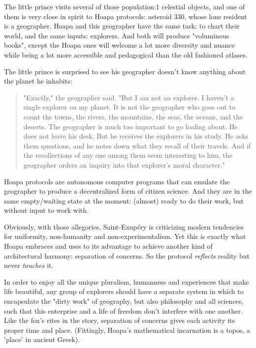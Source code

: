 \documentclass[11pt]{article}
\begin{document}
The little prince visits several of those population:1 celestial objects, and one of them is very close in spirit to Hoapa protocols: asteroid 330, whose lone resident is a geographer. Hoapa and this geographer have the same task: to chart their world, and the same inputs: explorers. And both will produce "voluminous books", except the Hoapa ones will welcome a lot more diversity and nuance while being a lot more accessible and pedagogical than the old fashioned atlases.

The little prince is surprised to see his geographer doesn't know anything about the planet he inhabits:

\begin{quote}
"Exactly," the geographer said. "But I am not an explorer. I haven't a single explorer on my planet. It is not the geographer who goes out to count the towns, the rivers, the mountains, the seas, the oceans, and the deserts. The geographer is much too important to go loafing about. He does not leave his desk. But he receives the explorers in his study. He asks them questions, and he notes down what they recall of their travels. And if the recollections of any one among them seem interesting to him, the geographer orders an inquiry into that explorer's moral character."
\end{quote}

Hoapa protocols are autonomous computer programs that can emulate the geographer to produce a decentralized form of citizen science. And they are in the same empty/waiting state at the moment: (almost) ready to do their work, but without input to work with.

Obviously, with those allegories, Saint-Exupéry is criticizing modern tendencies for uniformity, non-humanity and non-experimentalism. Yet this is exactly what Hoapa embraces and uses to its advantage to achieve another kind of architectural harmony: separation of concerns. So the protocol \emph{reflects} reality but never \emph{touches} it.

In order to enjoy all the unique pluralism, humanness and experiences that make life beautiful, any group of explorers should have a separate system in which to encapsulate the "dirty work" of geography, but also philosophy and all sciences, such that this enterprise and a life of freedom don't interfere with one another. Like the fox's rites in the story, separation of concerns gives each activity its proper time and place. (Fittingly, Hoapa's mathematical incarnation is a topos, a 'place' in ancient Greek).
\end{document}
